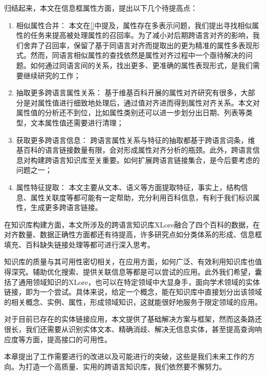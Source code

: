 归结起来，本文在信息框属性方面，提出以下几个待提高点：
\begin{enumerate}[1)]
\item {\heiti 相似属性合并：} 本文在\ref{}中提及，属性存在多表示问题，我们提出寻找相似属性的任务来提高被处理属性的召回率。为了减小对后期跨语言对齐的影响，我们舍弃了召回率，保留了基于同语言对齐而提取出的更为精准的属性多表现形式。然而，同语言相似属性的查找依然是属性对齐过程中一个亟待解决的问题。如何通过同语言间的关系，找出更多、更准确的属性表现形式，是我们需要继续研究的工作；
\item {\heiti 抽取更多跨语言属性关系：} 基于维基百科开展的属性对齐研究有很多，大部分是对属性值进行细致地处理后，通过值对齐进而得到属性对齐关系。本文对属性值的分析还不到位，比如属性类别还可以进一步划分出日期、列表等类型，文本属性值还需要进行清理；
\item {\heiti 获取更多跨语言信息：} 跨语言属性关系与特征的抽取都基于跨语言词条，维基百科的语言链接数量有限，会对形成属性对齐分析的瓶颈。此外，跨语言信息对构建跨语言知识库至关重要。如何扩展跨语言链接集合，是今后要考虑的问题之一；
\item {\heiti 属性特征提取：} 本文主要从文本、语义等方面提取特征，事实上，结构信息、属性关联度等都可能有一定帮助，充分利用百科信息，有利于我们标识属性，生成更多跨语言链接。
\end{enumerate}

在知识库构建方面，本文所涉及的跨语言知识库XLore融合了四个百科的数据，在对齐数量、数据正确性方面都还有待提高，许多研究点如分类体系的形成、信息框填充、百科缺失链接处理等都可进行深入思考。

知识库的质量与其可用性密切相关，在应用方面，如何广泛、有效利用知识库也值得深究。辅助优化搜索、提供关联信息等都是可以尝试的应用。此外我们希望，囊括了通用领域知识的XLore，也可以在特定领域中大显身手，面向学术领域的实体链接，即为一个尝试。具体来说，给定一个概念，能在知识库中直接划分出该领域的相关概念、实例、属性，形成领域知识，这就能很好地服务于限定领域的应用。

对于目前已存在的实体链接应用，本文提供了基础解决方案与框架，然而这条路还很长，我们还需要从识别实体文本、精确消歧、解决无信息实体，甚至提高查询响应度等方面，提高接口的可用性。

本章提出了工作需要进行的改进以及可能进行的突破，这些是我们未来工作的方向。为打造一个高质量、实用的跨语言知识库，我们依然要不懈努力。

